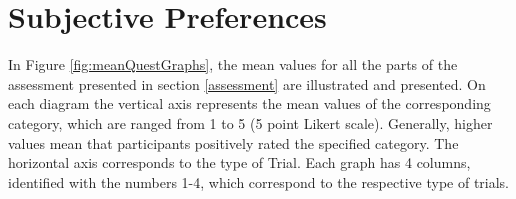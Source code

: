 \section{Subjective Preferences}
\label{resultsSubjectivePreferences}

In Figure \ref{fig:meanQuestGraphs}, the mean values for all the parts of the assessment presented in section \ref{assessment} are illustrated and presented. On each diagram the vertical axis represents the mean values of the corresponding category, which are ranged from 1 to 5 (5 point Likert scale). Generally, higher values mean that participants positively rated the specified category. The horizontal axis corresponds to the type of Trial. Each graph has 4 columns, identified with the numbers 1-4, which correspond to the respective type of trials.

